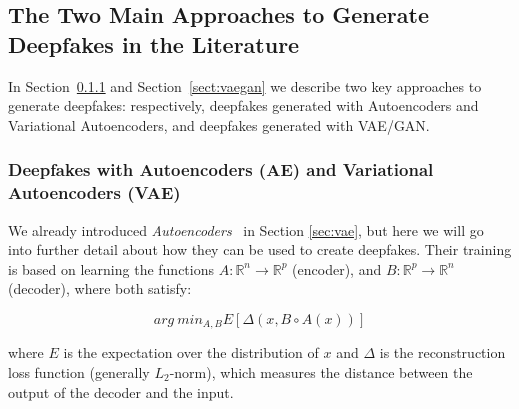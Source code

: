 \documentclass[preprint]{elsarticle}
\begin{document}
\subsection{The Two Main Approaches to Generate Deepfakes in the Literature}\label{section:vaegan}
In Section~\ref{sec:deep-vae} and Section~\ref{sect:vaegan} we describe two key approaches to generate deepfakes: respectively, deepfakes generated with Autoencoders and Variational Autoencoders, and deepfakes generated with VAE/GAN.

\subsubsection{Deepfakes with Autoencoders (AE) and Variational Autoencoders (VAE)}\label{sec:deep-vae}

We already introduced \emph{Autoencoders}~\cite{bank2021autoencoders} in Section \ref{sec:vae}, but here we will go into further detail  about how they can be used to create deepfakes. Their training is based on learning the functions $A : \mathbb{R}^n \rightarrow \mathbb{R}^p$ (encoder), 
and $B:\mathbb{R}^p \rightarrow \mathbb{R}^n$ (decoder), where both satisfy:

\begin{equation}
	arg~min_{A,B}E[\Delta(x,B \circ A(x))]
\end{equation}

where $E$ is the expectation over the distribution of $x$ and $\Delta$ is the reconstruction loss function (generally $L_2$-norm), which measures the distance between the output of the decoder and the input.
\end{document}

